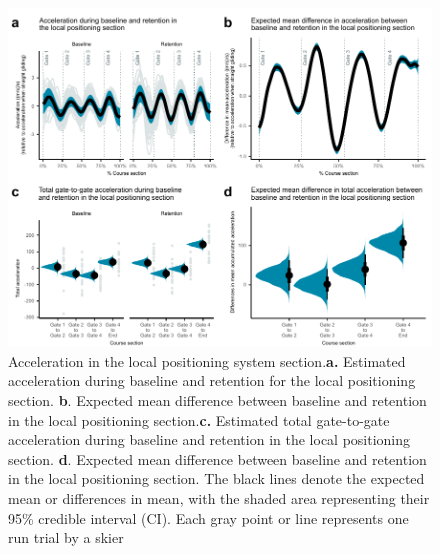 \documentclass{article}
\begin{document}
\begin{figure}[H]
\centering
\includegraphics{figurer/figure_acc_2.pdf}
\caption{Acceleration in the local positioning system section.\textbf{a.} Estimated acceleration during baseline and retention for the local positioning section. \textbf{b}. Expected mean difference between baseline and retention in the local positioning section.\textbf{c.} Estimated total gate-to-gate acceleration during baseline and retention in the local positioning section. \textbf{d}. Expected mean difference between baseline and retention in the local positioning section. The black lines denote the expected mean or differences in mean, with the shaded area representing their 95\% credible interval (CI). Each gray point or line represents one run trial by a skier}\label{fig: acc}
\end{figure}




\printbibliography %
\end{document}

